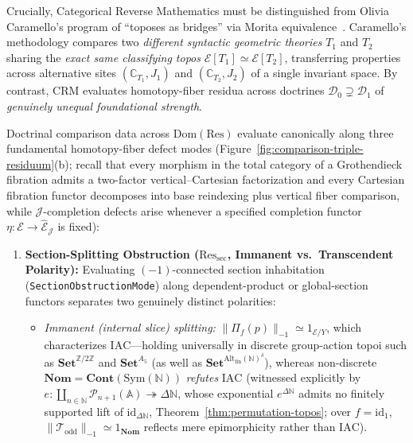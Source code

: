 Crucially, Categorical Reverse Mathematics must be distinguished from Olivia Caramello's program of ``toposes as bridges'' via Morita equivalence~\cite{Caramello18}. Caramello's methodology compares two \emph{different syntactic geometric theories} $T_1$ and $T_2$ sharing the \emph{exact same classifying topos} $\mathcal{E}[T_1] \simeq \mathcal{E}[T_2]$, transferring properties across alternative sites $(\mathbb{C}_{T_1}, J_1)$ and $(\mathbb{C}_{T_2}, J_2)$ of a single invariant space. By contrast, $\mathrm{CRM}$ evaluates homotopy-fiber residua across doctrines $\mathcal{D}_0 \supsetneq \mathcal{D}_1$ of \emph{genuinely unequal foundational strength}.

\begin{proposition}\label{prop:tri-modal-factorization}%
%
%
Doctrinal comparison data across $\mathrm{Dom}(\mathrm{Res})$ evaluate canonically along three fundamental homotopy-fiber defect modes (Figure~\ref{fig:comparison-triple-residuum}(b); recall that every morphism in the total category of a Grothendieck fibration admits a two-factor vertical--Cartesian factorization and every Cartesian fibration functor decomposes into base reindexing plus vertical fiber comparison, while $\mathcal{J}$-completion defects arise whenever a specified completion functor $\eta : \mathcal{E} \to \widehat{\mathcal{E}}_{\mathcal{J}}$ is fixed):
\begin{enumerate}
  \item \textbf{Section-Splitting Obstruction ($\mathrm{Res}_{\mathrm{sec}}$, Immanent vs.\ Transcendent Polarity):} Evaluating $(-1)$-connected section inhabitation (\texttt{SectionObstructionMode}) along dependent-product or global-section functors separates two genuinely distinct polarities:
  \begin{itemize}
    \item \emph{Immanent (internal slice) splitting:} $\|\Pi_f(p)\|_{-1} \simeq 1_{\mathcal{E}/Y}$, which characterizes $\mathrm{IAC}$---holding universally in discrete group-action topoi such as $\mathbf{Set}^{\mathbb{Z}/2\mathbb{Z}}$ and $\mathbf{Set}^{A_5}$ (as well as $\mathbf{Set}^{\mathrm{Alt}_{\mathrm{fin}}(\mathbb{N})^\delta}$), whereas non-discrete $\mathbf{Nom} = \mathbf{Cont}(\mathrm{Sym}(\mathbb{N}))$ \emph{refutes} $\mathrm{IAC}$ (witnessed explicitly by $e : \coprod_{n \in \mathbb{N}} \mathcal{P}_{n+1}(\mathbb{A}) \twoheadrightarrow \Delta\mathbb{N}$, whose exponential $e^{\Delta\mathbb{N}}$ admits no finitely supported lift of $\mathrm{id}_{\Delta\mathbb{N}}$, Theorem~\ref{thm:permutation-topos}; over $f = \mathrm{id}_1$, $\|\mathcal{T}_{\mathrm{odd}}\|_{-1} \simeq 1_{\mathbf{Nom}}$ reflects mere epimorphicity rather than $\mathrm{IAC}$).

\end{itemize}
\end{enumerate}
\end{proposition}
